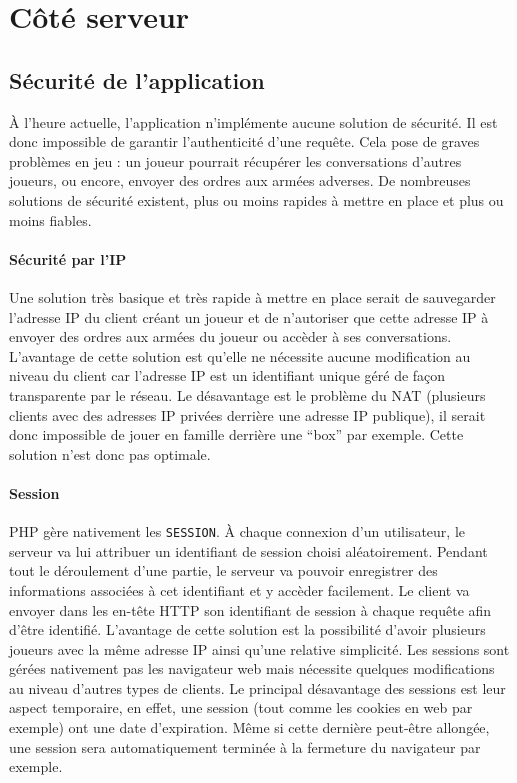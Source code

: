 \section{Côté serveur}

	\subsection{Sécurité de l'application} %
	\label{sub:securite_de_l_application}

		À l'heure actuelle, l'application n'implémente aucune solution de sécurité. Il est donc impossible de garantir l'authenticité d'une requête. Cela pose de graves problèmes en jeu : un joueur pourrait récupérer les conversations d'autres joueurs, ou encore, envoyer des ordres aux armées adverses. De nombreuses solutions de sécurité existent, plus ou moins rapides à mettre en place et plus ou moins fiables.

		\paragraph{Sécurité par l'IP} %
		\label{par:securite_par_l_ip}

			Une solution très basique et très rapide à mettre en place serait de sauvegarder l'adresse IP du client créant un joueur et de n'autoriser que cette adresse IP à envoyer des ordres aux armées du joueur ou accèder à ses conversations. L'avantage de cette solution est qu'elle ne nécessite aucune modification au niveau du client car l'adresse IP est un identifiant unique géré de façon transparente par le réseau. Le désavantage est le problème du NAT (plusieurs clients avec des adresses IP privées derrière une adresse IP publique), il serait donc impossible de jouer en famille derrière une \enquote{box} par exemple. Cette solution n'est donc pas optimale.


		\paragraph{Session} %
		\label{par:session}

			PHP gère nativement les \texttt{SESSION}. À chaque connexion d'un utilisateur, le serveur va lui attribuer un identifiant de session choisi aléatoirement. Pendant tout le déroulement d'une partie, le serveur va pouvoir enregistrer des informations associées à cet identifiant et y accèder facilement. Le client va envoyer dans les en-tête HTTP son identifiant de session à chaque requête afin d'être identifié. L'avantage de cette solution est la possibilité d'avoir plusieurs joueurs avec la même adresse IP ainsi qu'une relative simplicité. Les sessions sont gérées nativement pas les navigateur web mais nécessite quelques modifications au niveau d'autres types de clients. Le principal désavantage des sessions est leur aspect temporaire, en effet, une session (tout comme les cookies en web par exemple) ont une date d'expiration. Même si cette dernière peut-être allongée, une session sera automatiquement terminée à la fermeture du navigateur par exemple.


